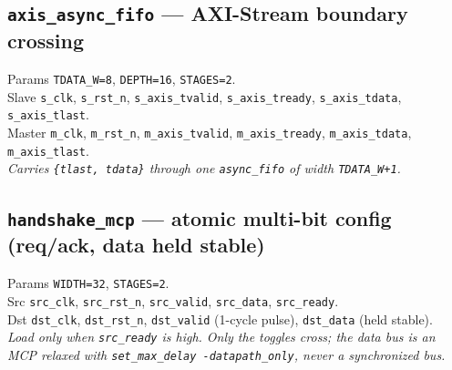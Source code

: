 \documentclass[10pt,a4paper]{article}
\newcommand{\code}[1]{\texttt{\small #1}}
\begin{document}
\subsection*{\code{axis\_async\_fifo} --- AXI-Stream boundary crossing}
Params \code{TDATA\_W=8}, \code{DEPTH=16}, \code{STAGES=2}. \\
Slave \code{s\_clk}, \code{s\_rst\_n}, \code{s\_axis\_tvalid}, \code{s\_axis\_tready},
\code{s\_axis\_tdata}, \code{s\_axis\_tlast}. \\
Master \code{m\_clk}, \code{m\_rst\_n}, \code{m\_axis\_tvalid}, \code{m\_axis\_tready},
\code{m\_axis\_tdata}, \code{m\_axis\_tlast}. \\
\emph{Carries \code{\{tlast, tdata\}} through one \code{async\_fifo} of width
\code{TDATA\_W+1}.}

\subsection*{\code{handshake\_mcp} --- atomic multi-bit config (req/ack, data held stable)}
Params \code{WIDTH=32}, \code{STAGES=2}. \\
Src \code{src\_clk}, \code{src\_rst\_n}, \code{src\_valid}, \code{src\_data},
\code{src\_ready}. \\
Dst \code{dst\_clk}, \code{dst\_rst\_n}, \code{dst\_valid} (1-cycle pulse),
\code{dst\_data} (held stable). \\
\emph{Load only when \code{src\_ready} is high. Only the toggles cross; the data bus
is an MCP relaxed with \code{set\_max\_delay -datapath\_only}, never a synchronized
bus.}
\end{document}
